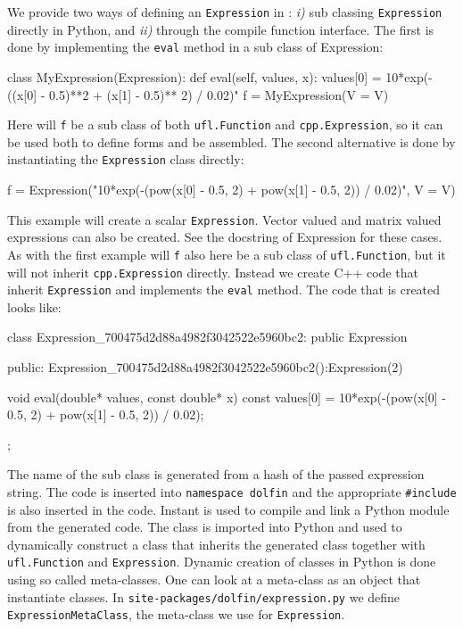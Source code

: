 \begin{code}
We provide two ways of defining an \texttt{Expression} in \pydolfin: \textit{i)} sub classing \texttt{Expression} directly in Python, and \textit{ii)} through the compile function interface. The first is done by implementing the \texttt{eval} method in a sub class of Expression:
\begin{code}
class MyExpression(Expression):
    def eval(self, values, x):
        values[0] = 10*exp(-((x[0] - 0.5)**2 + (x[1] - 0.5)** 2) / 0.02)"
f = MyExpression(V = V)
\end{code}
Here will \texttt{f} be a sub class of both \texttt{ufl.Function} and \texttt{cpp.Expression}, so it can be used both to define \ufl forms and be assembled. The second alternative is done by instantiating the \texttt{Expression} class directly:
\begin{code}
f = Expression("10*exp(-(pow(x[0] - 0.5, 2) + pow(x[1] - 0.5, 2)) / 0.02)", V = V)
\end{code}
This example will create a scalar \texttt{Expression}. Vector valued and matrix valued expressions can also be created. See the docstring of Expression for these cases. As with the first example will \texttt{f} also here be a sub class of \texttt{ufl.Function}, but it will not inherit \texttt{cpp.Expression} directly. Instead we create C++ code that inherit \texttt{Expression} and implements the \texttt{eval} method. The code that is created looks like:
\begin{code}
class Expression_700475d2d88a4982f3042522e5960bc2: public Expression{
public:
  Expression_700475d2d88a4982f3042522e5960bc2():Expression(2){}

  void eval(double* values, const double* x) const{
    values[0] = 10*exp(-(pow(x[0] - 0.5, 2) + pow(x[1] - 0.5, 2)) / 0.02);
  }
};
\end{code}
The name of the sub class is generated from a hash of the passed expression string. The code is inserted into \texttt{namespace dolfin} and the appropriate \texttt{\#include} is also inserted in the code. Instant is used to compile and link a Python module from the generated code. The class is imported into Python and used to dynamically construct a class that inherits the generated class together with \texttt{ufl.Function} and \texttt{Expression}. Dynamic creation of classes in Python is done using so called meta-classes. One can look at a meta-class as an object that instantiate classes. In \texttt{site-packages/dolfin/expression.py} we define \texttt{ExpressionMetaClass}, the meta-class we use for \texttt{Expression}.\par


\end{code}
